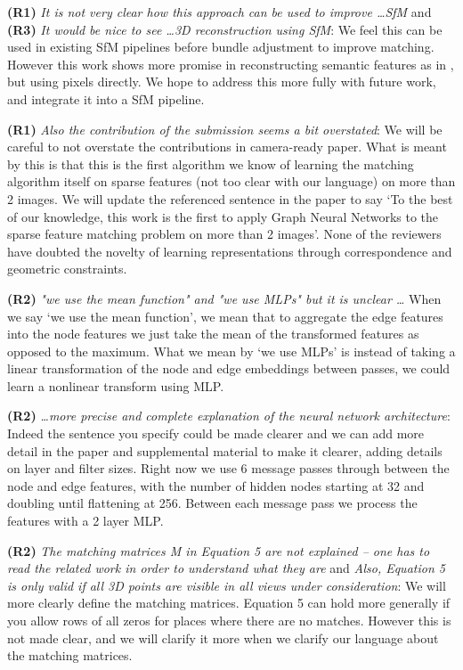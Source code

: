 \documentclass[10pt,twocolumn,letterpaper]{article}
\begin{document}
\textbf{(R1)} \textit{It is not very clear how this approach can be used to improve \ldots SfM} and \textbf{(R3)} \textit{It would be nice to see \ldots 3D reconstruction using SfM}:
We feel this can be used in existing SfM pipelines before bundle adjustment to improve matching.
However this work shows more promise in reconstructing semantic features as in \cite{wang2017multi}, but using pixels directly.
We hope to address this more fully with future work, and integrate it into a SfM pipeline.

\textbf{(R1)} \textit{Also the contribution of the submission seems a bit overstated}:
We will be careful to not overstate the contributions in camera-ready paper.
What is meant by this is that this is the first algorithm we know of learning the matching algorithm itself on sparse features (not too clear with our language) on more than 2 images.
We will update the referenced sentence in the paper to say `To the best of our knowledge, this work is the first to apply Graph Neural Networks to the sparse feature matching problem on more than 2 images'.
None of the reviewers have doubted the novelty of learning representations through correspondence and geometric constraints.


\textbf{(R2)} \textit{"we use the mean function" and "we use MLPs" but it is unclear \ldots}
When we say `we use the mean function', we mean that to aggregate the edge features into the node features we just take the mean of the transformed features as opposed to the maximum.
What we mean by `we use MLPs' is instead of taking a linear transformation of the node and edge embeddings between passes, we could learn a nonlinear transform using MLP.

\textbf{(R2)} \textit{\ldots more precise and complete explanation of the neural network architecture}:
Indeed the sentence you specify could be made clearer and we can add more detail in the paper and supplemental material to make it clearer, adding details on layer and filter sizes.
Right now we use 6 message passes through between the node and edge features, with the number of hidden nodes starting at 32 and doubling until flattening at 256. Between each message pass we process the features with a 2 layer MLP.

\textbf{(R2)} \textit{The matching matrices M in Equation 5 are not explained -- one has to read the related work in order to understand what they are} and \textit{Also, Equation 5 is only valid if all 3D points are visible in all views under consideration}:
We will more clearly define the matching matrices.
Equation 5 can hold more generally if you allow rows of all zeros for places where there are no matches.
However this is not made clear, and we will clarify it more when we clarify our language about the matching matrices.
\end{document}
